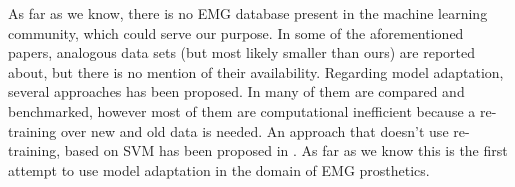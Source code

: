 As far as we know, there is no EMG database present in the machine
learning community, which could serve our purpose. In some of the
aforementioned papers, analogous data sets (but most likely smaller
than ours) are reported about, but there is no mention of their
availability.
Regarding model adaptation, several approaches has been proposed.
In \cite{daume07easyadapt} many of them are compared and benchmarked,
however most of them are computational inefficient because a re-training
over new and old data is needed. An approach that doesn't use re-training,
based on SVM has been proposed in \cite{YangYH07}. As far as we know this
is the first attempt to use model adaptation in the domain of EMG
prosthetics.
